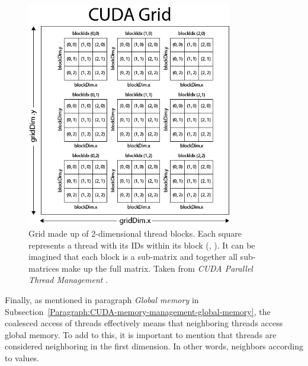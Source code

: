 \begin{figure}[h!]
	\centering
	\includegraphics[width=0.8\textwidth, keepaspectratio]{images/ch1/CUDA-GridBlockThread-Structure.png}
	\caption{Grid made up of 2-dimensional thread blocks. Each square represents a thread with its IDs within its block (, ). It can be imagined that each block is a sub-matrix and together all sub-matrices make up the full matrix. Taken from \emph{CUDA Parallel Thread Management} \cite{McKennon13June2013}.}
	\label{Figure:CUDA-GridBlockThread-Structure}
\end{figure}

Finally, as mentioned in paragraph \textit{Global memory} in Subsection~\ref{Paragraph:CUDA-memory-management-global-memory}, the coalesced access of threads effectively means that neighboring threads access global memory. To add to this, it is important to mention that threads are considered neighboring in the first dimension. In other words, neighbors according to  values.

